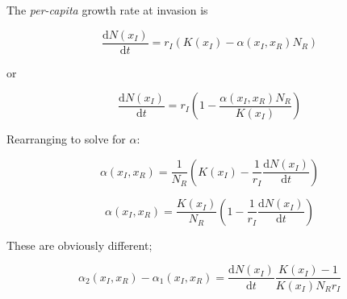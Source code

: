\documentclass[10pt]{article}
\newcommand{\ud}{\ensuremath{\mathrm{d}}}
\begin{document}
The \textit{per-capita} growth rate at invasion is

\begin{equation}
  \label{eq:v1}
  \frac{\ud N(x_I)}{\ud t} = r_I\left(K(x_I) - \alpha(x_I, x_R) N_R\right)
\end{equation}

or

\begin{equation}
  \label{eq:v2}
  \frac{\ud N(x_I)}{\ud t} = 
  r_I\left(1 - \frac{\alpha(x_I, x_R) N_R}{K(x_I)}\right)
\end{equation}

Rearranging to solve for $\alpha$:

\begin{equation}
  \label{eq:a1}
  \alpha(x_I, x_R) = \frac{1}{N_R}
  \left(K(x_I) - \frac{1}{r_I}\frac{\ud N(x_I)}{\ud t}\right)
\end{equation}

\begin{equation}
  \label{eq:a2}
  \alpha(x_I, x_R) = \frac{K(x_I)}{N_R}
  \left(1 - \frac{1}{r_I}\frac{\ud N(x_I)}{\ud t}\right)
\end{equation}

These are obviously different;

\begin{equation*}
  \alpha_2(x_I, x_R) - \alpha_1(x_I, x_R) = 
  \frac{\ud N(x_I)}{\ud t} \frac{K(x_I) - 1}{K(x_I) N_R r_I}
\end{equation*}
\end{document}
